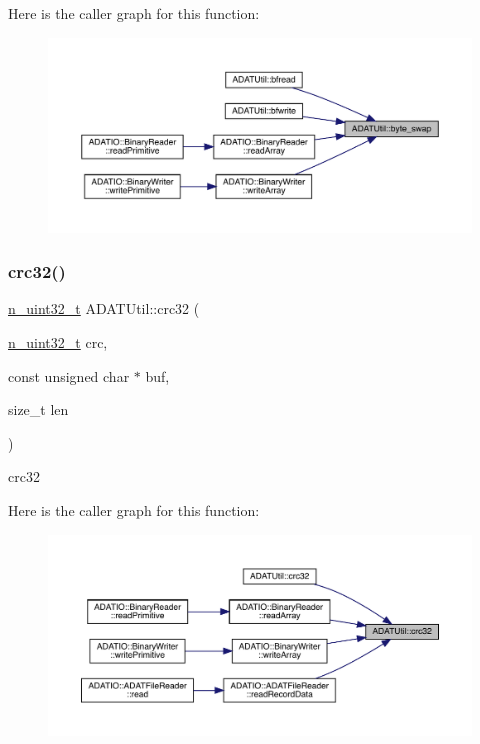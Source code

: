 Here is the caller graph for this function\+:\nopagebreak
\begin{figure}[H]
\begin{center}
\leavevmode
\includegraphics[width=350pt]{de/d19/namespaceADATUtil_af522573b90be52b1e09342dd11e23199_icgraph}
\end{center}
\end{figure}
\mbox{\label{namespaceADATUtil_a61372c5ac63a8bd3ce0aec8f04f386d9}} 
\subsubsection{\texorpdfstring{crc32()}{crc32()}\hspace{0.1cm}{\footnotesize\ttfamily [1/2]}}
{\footnotesize\ttfamily \mbox{\hyperlink{namespaceADATUtil_ad945a8afa4db2d1f89b731964adae97e}{n\+\_\+uint32\+\_\+t}} A\+D\+A\+T\+Util\+::crc32 (\begin{DoxyParamCaption}\item[{\mbox{\hyperlink{namespaceADATUtil_ad945a8afa4db2d1f89b731964adae97e}{n\+\_\+uint32\+\_\+t}}}]{crc,  }\item[{const unsigned char $\ast$}]{buf,  }\item[{size\+\_\+t}]{len }\end{DoxyParamCaption})}



crc32 

Here is the caller graph for this function\+:\nopagebreak
\begin{figure}[H]
\begin{center}
\leavevmode
\includegraphics[width=350pt]{de/d19/namespaceADATUtil_a61372c5ac63a8bd3ce0aec8f04f386d9_icgraph}
\end{center}
\end{figure}
\mbox{\label{namespaceADATUtil_aea7a30b468249f17899ebbb9902fb330}} 
